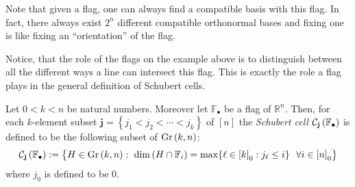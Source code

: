 Note that given a flag, one can always find a compatible basis with this flag. In fact, there always exist $2^n$ different compatible orthonormal bases and fixing one is like fixing an ``orientation'' of the flag.

Notice, that the role of the flags on the example above is to distinguish between all the different ways a line can intersect this flag. This is exactly the role a flag plays in the general definition of Schubert cells.

\begin{definition} Let $0<k<n$ be natural numbers. Moreover let $\mathbb{F}_{\bullet}$ be a flag of $\mathbb{R}^n$. Then, for each $k$-element subset $\mathbf{j}=\left\{j_1<j_2<\cdots<j_k\right\}$ of $[n]$ the \emph{Schubert cell} $\mathcal{C}_{\mathbf{j}}\left(\mathbb{F}_{\bullet}\right)$ is defined to be the following subset of $\Gr{k}{n}$:
\[\grcell{j}:=\big\{H\in\Gr{k}{n}:\ \dim\left(H\cap\mathbb{F}_i\right)=\max\{\ell\in{[k]}_0:j_{\ell}\leq i\}\ \ \forall i\in{[n]}_0\big\}\]
where $j_0$ is defined to be $0$.
\end{definition}

